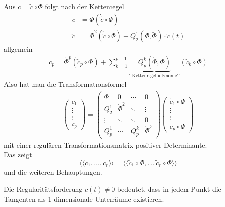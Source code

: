 \begin{beweis}
 Aus \(c = \widetilde c \circ \Phi\) folgt nach der Kettenregel
 \begin{align*}
  \dot c &= \dot \Phi \left(\dot{\widetilde c} \circ \Phi \right)\\
  \ddot c &= \dot \Phi^2 \left( \ddot{\widetilde c} \circ \Phi \right) + Q_2^1 \left( \dot \Phi, \ddot \Phi \right) \cdot \dot {\widetilde c}(t)
 \end{align*}
allgemein 
\begin{align*}
 c_p= \dot \Phi^p (\widetilde c_p \circ \Phi) + \sum_{k=1}^{p-1} \underbrace{Q_p^k \left( \dot \Phi, \ddot \Phi \right)}_{\text{"`Kettenregelpolynome"'}} \left( \widetilde c_k \circ \Phi \right)
\end{align*}
Also hat man die Transformationsformel
\begin{align*}
 \begin{pmatrix}
  c_1 \\
  \vdots \\
  \vdots \\
  c_p
 \end{pmatrix} = \begin{pmatrix}
		  \dot \Phi &0 & \cdots & 0 \\
		  Q_2^1& \dot \Phi^2 & \ddots  & \vdots \\
		  \vdots & \ddots & \ddots &0 \\
		  Q_p^1 & \cdots & Q_p^k & \dot \Phi^p
		 \end{pmatrix} \begin{pmatrix}
				\widetilde c_1 \circ \Phi \\
				\vdots \\
				\vdots \\
				\widetilde c_p \circ \Phi
			       \end{pmatrix}
\end{align*}
mit einer regulären Transformationsmatrix positiver Determinante. \\
Das zeigt 
\[
 \langle \langle c_1, \dots, c_p \rangle \rangle = \langle \langle \widetilde c_1 \circ \Phi, \dots, \widetilde c_p \circ \Phi \rangle \rangle
\]
und die weiteren Behauptungen.
\end{beweis}

\begin{bemerkung}
 Die Regularitätsforderung \(\dot c(t) \ne 0\) bedeutet, dass in jedem Punkt die Tangenten als 1-dimensionale Unterräume existieren.
\end{bemerkung}

